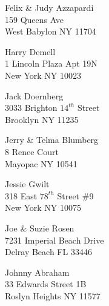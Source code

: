 \documentclass{article}
\begin{document}
\begin{center}
\begin{Huge}
\clearpage

\vspace*{\fill}
Felix \& Judy Azzapardi\\
159 Queens Ave\\
West Babylon NY 11704\\
\vspace{\fill}

\clearpage

\vspace*{\fill}
Harry Demell\\
1 Lincoln Plaza Apt 19N\\
New York NY 10023\\
\vspace{\fill}

\clearpage

\vspace*{\fill}
Jack Doernberg\\
3033 Brighton $14^{th}$ Street\\
Brooklyn NY 11235\\
\vspace{\fill}

\clearpage

\vspace*{\fill}
Jerry \& Telma Blumberg\\
8 Renee Court\\
Mayopac NY 10541\\
\vspace{\fill}

\clearpage

\vspace*{\fill}
Jessie Gwilt\\
318 East $78^{th}$ Street \#9\\
New York NY 10075\\
\vspace{\fill}

\clearpage

\vspace*{\fill}
Joe \& Suzie Rosen\\
7231 Imperial Beach Drive\\
Delray Beach FL  33446\\
\vspace{\fill}

\clearpage

\vspace*{\fill}
Johnny Abraham\\
33 Edwards Street 1B\\
Roslyn Heights NY 11577\\
\vspace{\fill}


\end{Huge}
\end{center}
\end{document}
